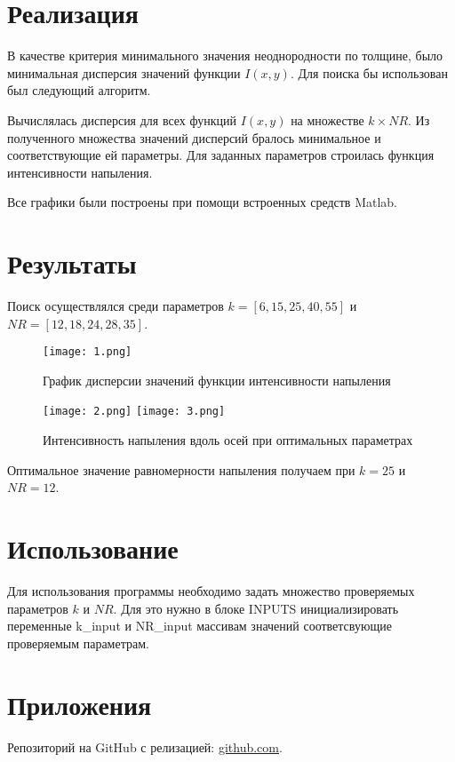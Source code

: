 \documentclass[12pt,a4paper]{scrartcl}
\begin{document}
\section {Реализация}

В качестве критерия минимального значения неоднородности по толщине, было минимальная дисперсия значений функции $I(x, y)$.
Для поиска бы использован был следующий алгоритм.

Вычислялась дисперсия для всех функций $I(x, y)$ на множестве $k\times NR$. Из полученного множества значений дисперсий бралось минимальное и соответствующие ей параметры. Для заданных параметров строилась функция интенсивности напыления.


Все графики были построены при помощи встроенных средств Matlab.
\section{Результаты}
Поиск осуществлялся среди параметров $k = [6, 15, 25, 40, 55]$ и $NR = [12, 18, 24, 28, 35]$.

\begin{figure}[H]
    \centering
    \texttt{[image: 1.png]}
    \caption{График дисперсии значений функции интенсивности напыления}
    \label{fig:f100}
\end{figure}
\begin{figure}[H]
    \texttt{[image: 2.png]}
    \texttt{[image: 3.png]}
    \caption{Интенсивность напыления вдоль осей при оптимальных параметрах}
    \label{fig:f100}
\end{figure}

Оптимальное значение равномерности напыления получаем при $k = 25$ и $NR = 12$.

\section{Использование}
Для использования программы необходимо задать множество проверяемых параметров $k$ и $NR$. Для это нужно в блоке INPUTS инициализировать переменные k\_input и NR\_input массивам значений соответсвующие проверяемым параметрам.

\section{Приложения}
Репозиторий на GitHub с релизацией: \href{https://github.com/WiillyWonka/MatStat}{github.com}.
\end{document}

